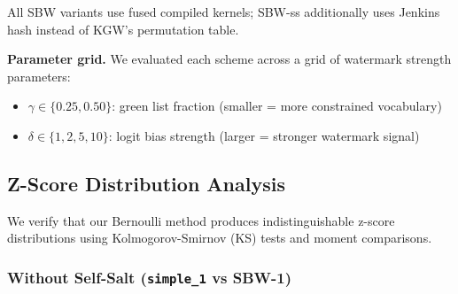 \documentclass[11pt]{article}
\begin{document}
\begin{table}[!t]
\caption{Watermark Schemes Evaluated. Top: statistical equivalence experiments. Bottom: performance benchmarks only.}
\label{tab:schemes}
\begin{center}
\footnotesize
{}
\end{center}
\vspace{-2mm}
\end{table}

All SBW variants use fused compiled kernels; SBW-ss additionally uses Jenkins hash instead of KGW's permutation table.

\textbf{Parameter grid.} We evaluated each scheme across a grid of watermark strength parameters:
\begin{itemize}
\item $\gamma \in \{0.25, 0.50\}$: green list fraction (smaller = more constrained vocabulary)
\item $\delta \in \{1, 2, 5, 10\}$: logit bias strength (larger = stronger watermark signal)
\end{itemize}

\subsection{Z-Score Distribution Analysis}
\label{sec:zscore}

We verify that our Bernoulli method produces indistinguishable z-score distributions using Kolmogorov-Smirnov (KS) tests and moment comparisons.

\subsubsection{Without Self-Salt (\texttt{simple\_1} vs SBW-1)}
\end{document}
